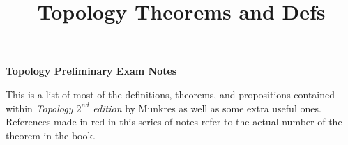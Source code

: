 
\title{Topology Theorems and Defs}

\newcommand{\thrm}[1]{\textbf{Theorem #1. }}
\newcommand{\lemm}[1]{\textbf{Lemma #1. }}
\newcommand{\prp}[1]{\textbf{Proposition #1. }}
\newcommand{\Lam}{\Lambda}


\begin{center}
\textbf{\Large Topology Preliminary Exam Notes}
\end{center}

This is a list of most of the definitions, theorems, and propositions contained within \textit{Topology $2^{nd}$ edition} by Munkres as well as some extra useful ones. References made in red in this series of notes refer to the actual number of the theorem in the book.\\

\tableofcontents
\newpage













